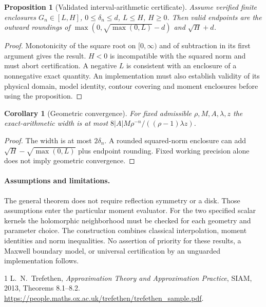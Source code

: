 \documentclass[11pt]{article}
\newtheorem{corollary}{Corollary}
\newtheorem{proposition}{Proposition}
\begin{document}
\begin{proposition}[Validated interval-arithmetic certificate]
Assume verified finite enclosures $G_n\in[L,H]$, $0\le\delta_n\le d$,
$L\le H$, $H\ge0$. Then valid endpoints are the outward roundings of
$\max(0,\sqrt{\max(0,L)}-d)$ and $\sqrt H+d$.
\end{proposition}
\begin{proof}
Monotonicity of the square root on $[0,\infty)$ and of subtraction
in its first argument gives the result. $H<0$ is incompatible with
the squared norm and must abort certification. A negative $L$ is
consistent with an enclosure of a nonnegative exact quantity.
An implementation must also establish validity of its physical domain,
model identity, contour covering and moment enclosures before using
the proposition.
\end{proof}

\begin{corollary}[Geometric convergence]
For fixed admissible $\rho,M,A,\lambda,z$ the exact-arithmetic
width is at most $8|A|M\rho^{-n}/((\rho-1)\lambda z)$.
\end{corollary}
\begin{proof}
The width is at most $2\delta_n$. A rounded squared-norm enclosure
can add $\sqrt{H}-\sqrt{\max(0,L)}$ plus endpoint rounding. Fixed
working precision alone does not imply geometric convergence.
\end{proof}
\paragraph{Assumptions and limitations.}
The general theorem does not require reflection symmetry or a disk.
Those assumptions enter the particular moment evaluator. For the two
specified scalar kernels the holomorphic neighborhood must be checked
for each geometry and parameter choice. The construction combines
classical interpolation, moment identities and norm inequalities.
No assertion of priority for these results, a Maxwell boundary model,
or universal certification by an unguarded implementation follows.
\begin{thebibliography}{1}
 L.\ N.\ Trefethen, \emph{Approximation Theory and
Approximation Practice}, SIAM, 2013, Theorems 8.1--8.2.
\url{https://people.maths.ox.ac.uk/trefethen/trefethen_sample.pdf}.
\end{thebibliography}
\end{document}
